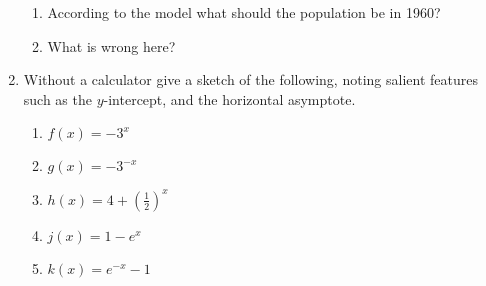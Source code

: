 \documentclass[12pt]{article}
\theoremstyle{plain}     %
\begin{document}
\begin{enumerate}
\begin{enumerate}
			\item According to the model what should the population be in 1960?
			\item What is wrong here?	
		\end{enumerate}
\newpage
	\item Without a calculator give a sketch of the following, noting salient features such as the $y$-intercept, and the horizontal asymptote.
	\begin{multicols}{2}
		\begin{enumerate}
			\item $f(x)=-3^x$\\
			\item $g(x)=-3^{-x}$\\
			\item $h(x)=4+(\frac{1}{2})^x$\\
			\item $j(x)=1-e^x$\\
			\item $k(x)=e^{-x}-1$\\
		\end{enumerate}
	\end{multicols}
	

\end{enumerate}
\end{document}

